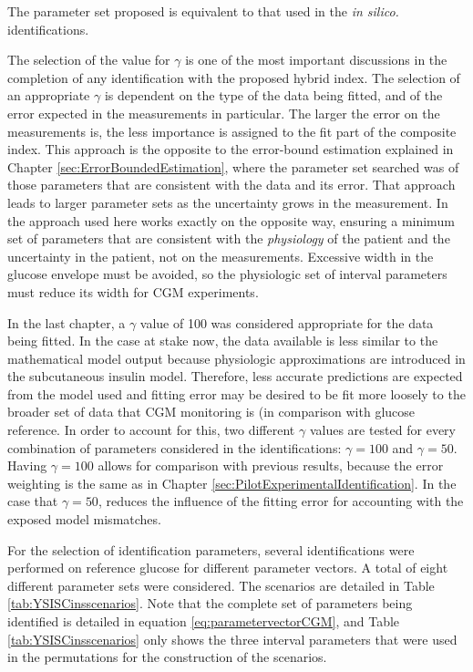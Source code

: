 The parameter set proposed is equivalent to that used in the \textit{in silico.} identifications.

The selection of the value for $\gamma$ is one of the most important discussions in the completion of any identification with the proposed hybrid index. The selection of an appropriate $\gamma$ is dependent on the type of the data being fitted, and of the error expected in the measurements in particular. The larger the error on the measurements is, the less importance is assigned to the fit part of the composite index. This approach is the opposite to the error-bound estimation explained in Chapter \ref{sec:ErrorBoundedEstimation}, where the parameter set searched was of those parameters that are consistent with the data and its error. That approach leads to larger parameter sets as the uncertainty grows in the measurement. In the approach used here works exactly on the opposite way, ensuring a minimum set of parameters that are consistent with the \emph{physiology} of the patient and the uncertainty in the patient, not on the measurements. Excessive width in the glucose envelope must be avoided, so the physiologic set of interval parameters must reduce its width for CGM experiments.

In the last chapter, a $\gamma$ value of 100 was considered appropriate for the data being fitted. In the case at stake now, the data available is less similar to the mathematical model output because physiologic approximations are introduced in the subcutaneous insulin model. Therefore, less accurate predictions are expected from the model used and fitting error may be desired to be fit more loosely to the broader set of data that CGM monitoring is (in comparison with glucose reference. In order to account for this, two different $\gamma$ values are tested for every combination of parameters considered in the identifications: $\gamma = 100$ and $\gamma = 50$. Having $\gamma = 100$ allows for comparison with previous results, because the error weighting is the same as in Chapter \ref{sec:PilotExperimentalIdentification}. In the case that $\gamma = 50$, reduces the influence of the fitting error for accounting with the exposed model mismatches.

For the selection of identification parameters, several identifications were performed on reference glucose for different parameter vectors. A total of eight different parameter sets were considered. The scenarios are detailed in Table \ref{tab:YSISCinsscenarios}. Note that the complete set of parameters being identified is detailed in equation \eqref{eq:parametervectorCGM}, and Table \ref{tab:YSISCinsscenarios} only shows the three interval parameters that were used in the permutations for the construction of the scenarios.

